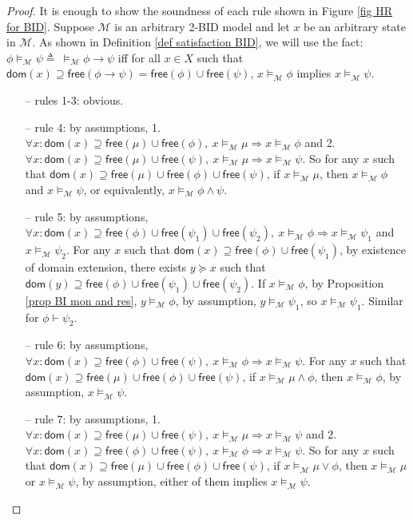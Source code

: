\documentclass[conference,compsoc, 10pt]{IEEEtran}
\newcommand {\cM } {{\mathcal{M}}}
\newcommand {\Ldom }[1] {{\mathsf{dom}\!\left(#1\right)}}
\newcommand {\Lfree }[1] {{\mathsf{free}{\left(#1\right)}}}
\begin{document}
\begin{appendices}
\begin{proof}
			It is enough to show the soundness of each rule shown in Figure \ref{fig HR for BID}. Suppose $\cM$ is an arbitrary 2-BID model and let $x$ be an arbitrary state in $\cM$. As shown in Definition \ref{def satisfaction BID}, we will use the fact:  $\phi\models_\cM\psi\triangleq\ \models_\cM \phi\rightarrow\psi$ iff for all $x\in X$ such that $\Ldom{x}\supseteq \Lfree{\phi\rightarrow\psi} = \Lfree{\phi}\cup\Lfree{\psi}$, $x\models_\cM\phi$ implies $x\models_\cM\psi$.
			\begin{itemize}
				\item[--] rules 1-3: obvious.
				\item[--] rule 4: by assumptions, 1. $\forall x: \Ldom{x}\supseteq\Lfree{\mu}\cup\Lfree{\phi}, \ x\models_\cM\mu\Rightarrow x\models_\cM\phi$ and 2. $\forall x: \Ldom{x}\supseteq\Lfree{\mu}\cup\Lfree{\psi}, \ x\models_\cM\mu\Rightarrow x\models_\cM\psi$. So for any $x$ such that $\Ldom{x}\supseteq\Lfree{\mu}\cup\Lfree{\phi}\cup\Lfree{\psi}$, if $x\models_\cM\mu$, then $x\models_\cM\phi$ and $x\models_\cM\psi$, or equivalently, $x\models_\cM\phi\wedge\psi$.
				\item[--] rule 5: by assumptions, $\forall x: \Ldom{x}\supseteq\Lfree{\phi}\cup\Lfree{\psi_1}\cup\Lfree{\psi_2}, \ x\models_\cM\phi\Rightarrow x\models_\cM\psi_1$ and $x\models_\cM\psi_2$. For any $x$ such that $\Ldom{x}\supseteq\Lfree{\phi}\cup\Lfree{\psi_1}$, by existence of domain extension, there exists $y\succeq x$ such that $\Ldom{y}\supseteq\Lfree{\phi}\cup\Lfree{\psi_1}\cup\Lfree{\psi_2}$. If $x\models_\cM\phi$, by Proposition \ref{prop BI mon and res}, $y\models_\cM\phi$, by assumption, $y\models_\cM\psi_1$, so $x\models_\cM\psi_1$. Similar for $\phi\vdash\psi_2$.
				\item[--] rule 6: by assumptions, $\forall x: \Ldom{x}\supseteq\Lfree{\phi}\cup\Lfree{\psi}, \ x\models_\cM\phi\Rightarrow x\models_\cM\psi$. For any $x$ such that $\Ldom{x}\supseteq\Lfree{\mu}\cup\Lfree{\phi}\cup\Lfree{\psi}$, if $x\models_\cM\mu\wedge\phi$, then $x\models_\cM\phi$, by assumption, $x\models_\cM\psi$.
				\item[--] rule 7: by assumptions, 1. $\forall x: \Ldom{x}\supseteq\Lfree{\mu}\cup\Lfree{\psi}, \ x\models_\cM\mu\Rightarrow x\models_\cM\psi$ and 2. $\forall x: \Ldom{x}\supseteq\Lfree{\phi}\cup\Lfree{\psi}, \ x\models_\cM\phi\Rightarrow x\models_\cM\psi$. So for any $x$ such that $\Ldom{x}\supseteq\Lfree{\mu}\cup\Lfree{\phi}\cup\Lfree{\psi}$, if $x\models_\cM\mu\vee\phi$, then $x\models_\cM\mu$ or $x\models_\cM\psi$, by assumption, either of them implies $x\models_\cM\psi$.

\end{itemize}
\end{proof}
\end{appendices}
\end{document}
